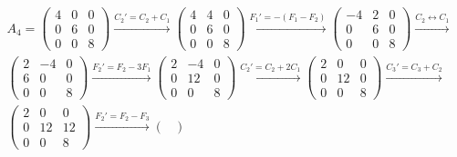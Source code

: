 \begin{ejercicio}
\begin{enumerate}
        \begin{multline*}
            A_4 = \begin{pmatrix}
                4 & 0 & 0 \\
                0 & 6 & 0 \\
                0 & 0 & 8
            \end{pmatrix}
            \xrightarrow{C_2'=C_2+C_1}
            \begin{pmatrix}
                4 & 4 & 0 \\
                0 & 6 & 0 \\
                0 & 0 & 8
            \end{pmatrix}
            \xrightarrow{F_1'=-(F_1-F_2)}
            \begin{pmatrix}
                -4 & 2 & 0 \\
                0 & 6 & 0 \\
                0 & 0 & 8
            \end{pmatrix}
            \xrightarrow{C_2\leftrightarrow C_1}\\
            \begin{pmatrix}
                2 & -4 & 0 \\
                6 & 0 & 0 \\
                0 & 0 & 8
            \end{pmatrix}
            \xrightarrow{F_2'=F_2-3F_1}
            \begin{pmatrix}
                2 & -4 & 0 \\
                0 & 12 & 0 \\
                0 & 0 & 8
            \end{pmatrix}
            \xrightarrow{C_2'=C_2+2C_1}
            \begin{pmatrix}
                2 & 0 & 0 \\
                0 & 12 & 0 \\
                0 & 0 & 8
            \end{pmatrix}
            \xrightarrow{C_3'=C_3+C_2}\\
            \begin{pmatrix}
                2 & 0 & 0 \\
                0 & 12 & 12 \\
                0 & 0 & 8
            \end{pmatrix}
            \xrightarrow{F_2'=F_2-F_3}
            \begin{pmatrix}

\end{pmatrix}
\end{multline*}
\end{enumerate}
\end{ejercicio}
